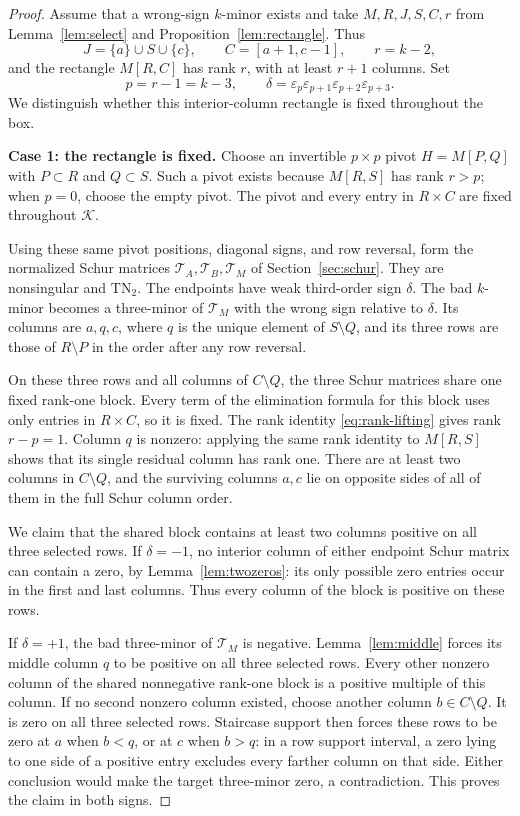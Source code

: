 \documentclass[10pt,a4paper]{article}
\theoremstyle{definition}
\theoremstyle{remark}
\numberwithin{equation}{section}
\newcommand{\eps}{\varepsilon}
\newcommand{\K}{\mathcal K}
\begin{document}
\begin{proof}
Assume that a wrong-sign $k$-minor exists and take $M,R,J,S,C,r$ from
Lemma~\ref{lem:select} and Proposition~\ref{lem:rectangle}. Thus
\[
 J=\{a\}\cup S\cup\{c\},\qquad
 C=[a+1,c-1],\qquad r=k-2,
\]
and the rectangle $M[R,C]$ has rank $r$, with at least $r+1$
columns. Set
\[
 p=r-1=k-3,\qquad
 \delta=\eps_p\eps_{p+1}\eps_{p+2}\eps_{p+3}.
\]
We distinguish whether this interior-column rectangle is fixed
throughout the box.

\medskip\noindent
\textbf{Case 1: the rectangle is fixed.}
Choose an invertible $p\times p$ pivot $H=M[P,Q]$ with
$P\subset R$ and $Q\subset S$. Such a pivot exists because
$M[R,S]$ has rank $r>p$; when $p=0$, choose the empty pivot.
The pivot and every entry in $R\times C$ are fixed throughout
$\K$.

Using these same pivot positions, diagonal signs, and row reversal,
form the normalized Schur matrices
$\mathcal T_A,\mathcal T_B,\mathcal T_M$ of
Section~\ref{sec:schur}. They are nonsingular and
$\mathrm{TN}_2$. The endpoints have weak third-order sign
$\delta$. The bad $k$-minor becomes a three-minor of
$\mathcal T_M$ with the wrong sign relative to $\delta$.
Its columns are $a,q,c$, where $q$ is the unique element of
$S\setminus Q$, and its three rows are those of $R\setminus P$
in the order after any row reversal.

On these three rows and all columns of $C\setminus Q$, the
three Schur matrices share one fixed rank-one block. Every term
of the elimination formula for this block uses only entries in
$R\times C$, so it is fixed. The rank identity
\eqref{eq:rank-lifting} gives rank $r-p=1$.
Column $q$ is nonzero: applying the same rank identity to
$M[R,S]$ shows that its single residual column has rank one.
There are at least two columns in $C\setminus Q$, and the
surviving columns $a,c$ lie on opposite sides of all of them in
the full Schur column order.

We claim that the shared block contains at least two columns
positive on all three selected rows. If $\delta=-1$, no interior
column of either endpoint Schur matrix can contain a zero, by
Lemma~\ref{lem:twozeros}: its only possible zero entries occur
in the first and last columns. Thus every column of the block
is positive on these rows.

If $\delta=+1$, the bad three-minor of $\mathcal T_M$ is
negative. Lemma~\ref{lem:middle} forces its middle column $q$
to be positive on all three selected rows. Every other nonzero
column of the shared nonnegative rank-one block is a positive
multiple of this column. If no second nonzero column existed,
choose another column $b\in C\setminus Q$. It is zero on all
three selected rows. Staircase support then forces these rows
to be zero at $a$ when $b<q$, or at $c$ when $b>q$: in a row
support interval, a zero lying to one side of a positive entry
excludes every farther column on that side. Either conclusion
would make the target three-minor zero, a contradiction. This
proves the claim in both signs.


\end{proof}
\end{document}

